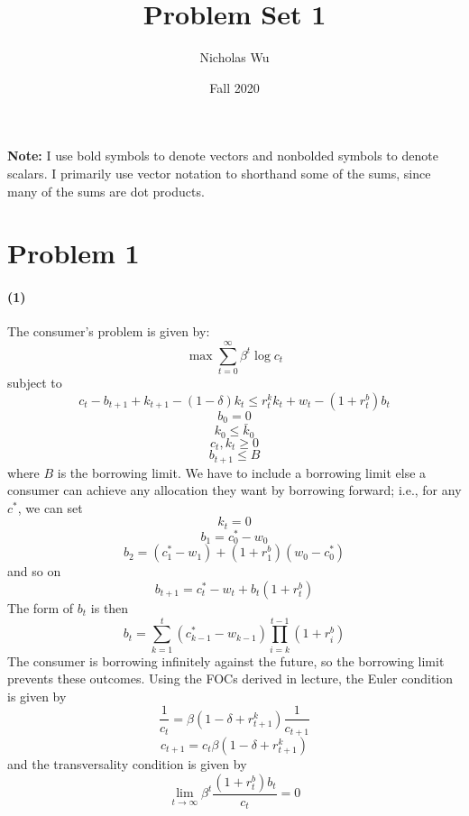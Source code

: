 \documentclass[10pt,letter]{article}
\newcommand{\problem}[1]{\section*{Problem #1}}
\newcommand{\problempart}[1]{\paragraph{#1}}
\begin{document}


\title{Problem Set 1}

\author{Nicholas Wu}

\date{Fall 2020}

\maketitle
\textbf{Note:} I use bold symbols to denote vectors and nonbolded symbols to denote scalars. I primarily use vector notation to shorthand some of the sums, since many of the sums are dot products.

\problem{1}

\problempart{(1)} The consumer's problem is given by:
\[ \max \sum_{t=0}^\infty \beta^t \log c_t\]
subject to
\[ c_t - b_{t+1} + k_{t+1} - (1-\delta) k_t \le r_t^k k_t + w_t - (1+r_t^b )b_t \]
\[ b_0 = 0 \]
\[ k_0 \le \bar{k}_0 \]
\[ c_t, k_t \ge 0 \]
\[ b_{t+1} \le B\]
where $B$ is the borrowing limit. We have to include a borrowing limit else a consumer can achieve any allocation they want by borrowing forward; i.e., for any $c^*$, we can set
\[ k_t = 0 \]
\[ b_1 =  c^*_0 - w_0 \]
\[ b_2 = ( c^*_1 - w_1) + (1+r_1^b)(w_0 - c^*_0)  \]
and so on
\[ b_{t+1} = c^*_t-w_t  + b_t(1 + r_t^b) \]
The form of $b_t$ is then
\[ b_t = \sum_{k=1}^{t} ( c^*_{k-1}-w_{k-1} ) \prod_{i={k}}^{t-1} (1+r_{i}^b) \]
The consumer is borrowing infinitely against the future, so the borrowing limit prevents these outcomes. Using the FOCs derived in lecture, the Euler condition is given by
\[ \frac{1}{c_t} = \beta (1-\delta + r^k_{t+1})\frac{1}{c_{t+1}} \]
\[ c_{t+1} = c_t \beta (1-\delta + r^k_{t+1}) \]
and the transversality condition is given by
\[ \lim_{t \to \infty} \beta^t\frac{(1 + r^b_t) b_t}{c_t} = 0 \]
\end{document}
